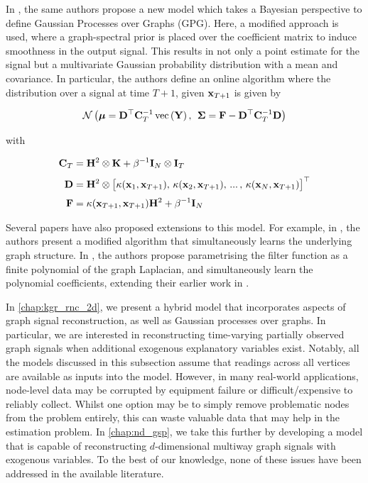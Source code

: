 In \cite{Venkitaraman2020}, the same authors propose a new model which takes a Bayesian perspective to define Gaussian Processes over Graphs (GPG). Here, a modified approach is used, where a graph-spectral prior is placed over the coefficient matrix to induce smoothness in the output signal. This results in not only a point estimate for the signal but a multivariate Gaussian probability distribution with a mean and covariance. In particular, the authors define an online algorithm where the distribution over a signal at time $T+1$, given $\mathbf{x}_{T+1}$ is given by 

\begin{equation}
     \; \mathcal{N}\left(\boldsymbol{\mu} = \mathbf{D}^\top \mathbf{C}_T^{-1}\,\text{\textup{vec}}\left(\mathbf{Y}\right), \, \; \mathbf{\Sigma} = \mathbf{F} - \mathbf{D}^\top \mathbf{C}_T^{-1} \mathbf{D}\right) \;
\end{equation}

with

\begin{align}
    \mathbf{C}_T &= \mathbf{H}^2 \otimes \mathbf{K} + \beta^{-1} \mathbf{I}_N \otimes \mathbf{I}_T \\[0.1cm]
    \mathbf{D} &= \mathbf{H}^2 \otimes \big[\kappa(\mathbf{x}_1, \mathbf{x}_{T+1}), \, \kappa(\mathbf{x}_2, \mathbf{x}_{T+1}), \, ... \, ,\, \kappa(\mathbf{x}_N, \mathbf{x}_{T+1})\big]^\top \\[0.1cm]
    \mathbf{F} &= \kappa(\mathbf{x}_{T+1}, \mathbf{x}_{T+1}) \mathbf{H}^2 + \beta^{-1} \mathbf{I}_N
\end{align}

Several papers have also proposed extensions to this model. For example, in \cite{Miao2022}, the authors present a modified algorithm that simultaneously learns the underlying graph structure. In \cite{Zhi2023}, the authors propose parametrising the filter function as a finite polynomial of the graph Laplacian, and simultaneously learn the polynomial coefficients, extending their earlier work in \cite{Pu2021}. 

In \cref{chap:kgr_rnc_2d}, we present a hybrid model that incorporates aspects of graph signal reconstruction, as well as Gaussian processes over graphs. In particular, we are interested in reconstructing time-varying partially observed graph signals when additional exogenous explanatory variables exist. Notably, all the models discussed in this subsection assume that readings across all vertices are available as inputs into the model. However, in many real-world applications, node-level data may be corrupted by equipment failure or difficult/expensive to reliably collect. Whilst one option may be to simply remove problematic nodes from the problem entirely, this can waste valuable data that may help in the estimation problem. In \cref{chap:nd_gsp}, we take this further by developing a model that is capable of reconstructing $d$-dimensional multiway graph signals with exogenous variables. To the best of our knowledge, none of these issues have been addressed in the available literature. 



